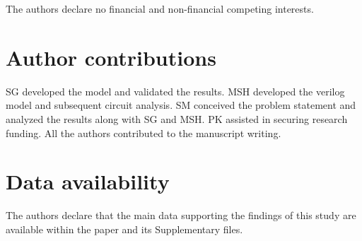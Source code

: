 \documentclass[aip,apl,reprint,floatfix]{revtex4-2}
\begin{document}
The authors declare no financial and non-financial competing interests.

\section{Author contributions}\label{contribution}

SG developed the model and validated the results. MSH developed the verilog model and subsequent circuit analysis. SM conceived the problem statement and analyzed the results along with SG and MSH. PK assisted in securing research funding. All the authors contributed to the manuscript writing.

\section{Data availability}\label{Data}

The authors declare that the main data supporting the findings of this study are available within the paper and its Supplementary files. 




%
\nocite{aip41Control}


\end{document}
